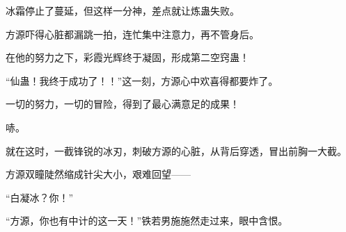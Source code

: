 \begin{this_body}
冰霜停止了蔓延，但这样一分神，差点就让炼蛊失败。

方源吓得心脏都漏跳一拍，连忙集中注意力，再不管身后。

在他的努力之下，彩霞光辉终于凝固，形成第二空窍蛊！

“仙蛊！我终于成功了！！”这一刻，方源心中欢喜得都要炸了。

一切的努力，一切的冒险，得到了最心满意足的成果！

哧。

就在这时，一截锋锐的冰刃，刺破方源的心脏，从背后穿透，冒出前胸一大截。

方源双瞳陡然缩成针尖大小，艰难回望——

“白凝冰？你！”

“方源，你也有中计的这一天！”铁若男施施然走过来，眼中含恨。

\end{this_body}

